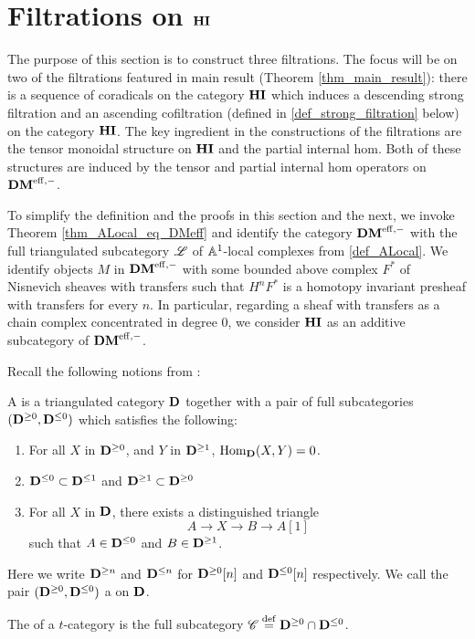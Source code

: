 \newpage
\chapter{Filtrations on $\mathbf{HI}$}\label{sect_filtration_hi}

The purpose of this section is to construct three filtrations. 
The focus will be on two of the filtrations featured in
main result (Theorem \ref{thm_main_result}): there is a sequence 
of coradicals on the category $\mathbf{HI}$ which induces a descending 
strong filtration and an ascending cofiltration (defined in 
\ref{def_strong_filtration} below) on the category $\mathbf{HI}$. The key 
ingredient in the constructions of the filtrations are the tensor 
monoidal structure on $\mathbf{HI}$ and the partial internal hom. Both
of these structures are induced by the tensor and partial internal 
hom operators on $\mathbf{DM}^{\mathrm{eff},-}$. 

To simplify the definition and the proofs in this section and the
next, we invoke Theorem \ref{thm_ALocal_eq_DMeff} and identify the 
category $\mathbf{DM}^{\mathrm{eff},-}$ with the full triangulated subcategory $\mathscr{L}$ 
of $\mathbb{A}^1$-local complexes from \ref{def_ALocal}. We identify 
objects $M$ in $\mathbf{DM}^{\mathrm{eff},-}$ with some bounded above complex $F^*$ of 
Nisnevich sheaves with transfers such that $H^nF^*$ is a homotopy 
invariant presheaf with transfers for every $n$. In particular, 
regarding a sheaf with transfers as a chain complex concentrated 
in degree 0, we consider $\mathbf{HI}$ as an additive subcategory of 
$\mathbf{DM}^{\mathrm{eff},-}$.

Recall the following notions from \cite[1.3]{BBD}:

\begin{defn}\label{def_t_struct}
A  is a triangulated category $\mathbf{D}$ together
with a pair of full subcategories $(\mathbf{D}^{\geq 0}, 
\mathbf{D}^{\leq 0})$ which satisfies the following:
\begin{enumerate}
\item For all $X$ in $\mathbf{D}^{\geq 0}$, and $Y$ in $\mathbf{D}^{\geq 1}$, 
$\mathrm{Hom}_{\mathbf{D}}(X, Y) = 0$.

\item $\mathbf{D}^{\leq 0} \subset \mathbf{D}^{\leq 1}$ and
$\mathbf{D}^{\geq 1} \subset \mathbf{D}^{\geq 0}$

\item For all $X$ in $\mathbf{D}$, there exists a distinguished 
triangle
\[
A \to X \to B \to A[1]
\]
such that $A \in \mathbf{D}^{\leq 0}$ and $B \in \mathbf{D}^{\geq 1}$.
\end{enumerate}
\noindent Here we write $\mathbf{D}^{\geq n}$ and $\mathbf{D}^{\leq n}$ for 
$\mathbf{D}^{\geq 0}[n]$ and $\mathbf{D}^{\leq 0}[n]$ respectively. We call
the pair $(\mathbf{D}^{\geq 0}, \mathbf{D}^{\leq 0})$ a  
on $\mathbf{D}$.

The  of a $t$-category is the full subcategory
$\mathscr{C} \stackrel{\mathrm{def}}{=} \mathbf{D}^{\geq 0} \cap \mathbf{D}^{\leq 0}$.
\end{defn}

